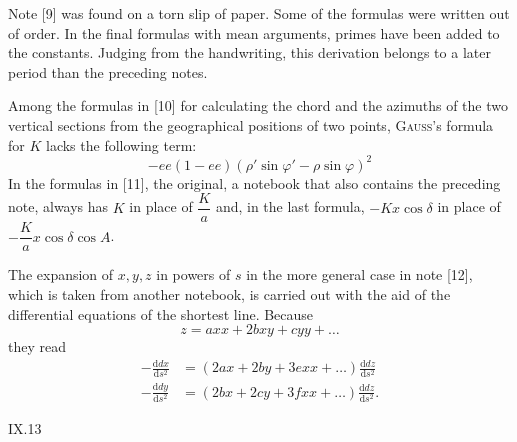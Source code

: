 {Note [9] was found on a torn slip of paper. Some of the formulas were written out of order. In the final formulas with mean arguments, primes have been added to the constants. Judging from the handwriting, this derivation belongs to a later period than the preceding notes.

Among the formulas in [10] for calculating the chord and the azimuths of the two vertical sections from the geographical positions of two points, \textsc{Gauss}'s formula for $K$ lacks the following term:
\[
-ee(1-ee)(\rho'\sin\varphi'-\rho\sin\varphi)^2
\]
In the formulas in [11], the original, a notebook that also contains the preceding note, always has $K$ in place of $\dfrac Ka$ and, in the last formula, $-Kx\cos\delta$ in place of $-\dfrac Ka x\cos\delta\cos A$.

The expansion of $x,y,z$ in powers of $s$ in the more general case in note [12], which is taken from another notebook, is carried out with the aid of the differential equations of the shortest line. Because
\[
z=axx+2bxy+cyy+\ldots
\]
they read
\[
\begin{aligned}
-\frac{\mathrm ddx}{\mathrm ds^2}&=(2ax+2by+3exx+\ldots)\frac{\mathrm ddz}{\mathrm ds^2}\\
-\frac{\mathrm ddy}{\mathrm ds^2}&=(2bx+2cy+3fxx+\ldots)\frac{\mathrm ddz}{\mathrm ds^2}.
\end{aligned}
\]
\par}
\noindent IX.\hfill 13\par

